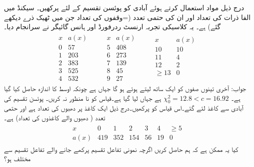 \quad
درج ذیل مواد استعمال کرتے ہوئے آبادی کو پوئسن تقسیم کے لئے پرکھیں۔ سیکنڈ میں الفا ذرات کی تعداد  اور  ان کی حتمی تعدد (=وقفوں کی تعداد جن میں ٹھیک  ذرے دیکھے گئے) ہے۔ یہ کلاسیکی تجربہ ارنسٹ ردرفورڈ اور ہانس گائیگر نے  سرانجام دیا۔
\begin{align*}
\begin{array}{rr}
x&a(x)\\
\hline
0&57\\
1&203\\
2&383\\
3&525\\
4&532
\end{array}\quad\quad
\begin{array}{rr}
x&a(x)\\
\hline
5&408\\
6&273\\
7&139\\
8&45\\
9&27
\end{array}\quad\quad
\begin{array}{rr}
x&a(x)\\
\hline
10&10\\
11&4\\
12&2\\
\ge 13&0\\
&
\end{array}
\end{align*}
جواب:\quad
آخری تینوں صفوں کو ایک ساتھ لیتے ہوئے  ہو گا جہاں  ہے چونکہ اوسط کا اندازہ حاصل کیا گیا ہے۔
$\chi^2_0=12.8<c=16.92$
ہے جہاں  لیا گیا ہے۔قیاس کو نا منظور نہ کریں۔ 
\quad
پوئسن تقسیم کی  آبادی سے  کاغذ لئے گئے۔اس قیاس کو پرکھیں۔درج ذیل ایک کاغذ پر دھبوں کی تعداد  ہے اور   حتمی تعدد ( دھبوں والے کاغذوں کی تعداد) ہے۔  
\begin{align*}
\begin{array}{ccccccc}
x&0&1&2&3&4&\ge 5\\
a(x)&419&352&154&56&19&0
\end{array}
\end{align*}
\quad
کیا یہ ممکن ہے کہ ہم  حاصل کریں اگرچہ  نمونی تفاعل تقسیم پرکھے جانے والے  تفاعل تقسیم  سے مختلف ہو؟




